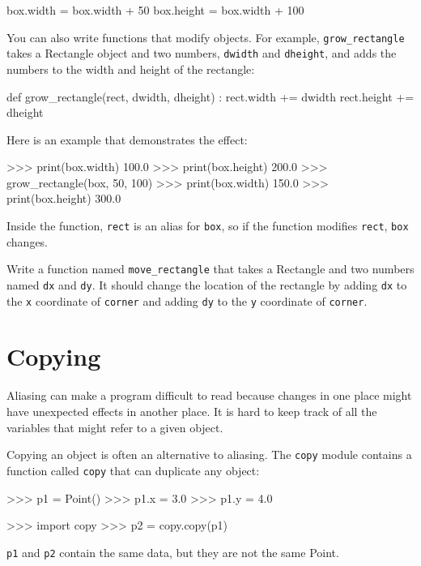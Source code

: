 \beforeverb
\begin{pycode}
box.width = box.width + 50
box.height = box.width + 100
\end{pycode}
\afterverb
%
You can also write functions that modify objects.  For example,
\verb"grow_rectangle" takes a Rectangle object and two numbers,
{\tt dwidth} and {\tt dheight}, and adds the numbers to the
width and height of the rectangle:

\beforeverb
\begin{pycode}
def grow_rectangle(rect, dwidth, dheight) :
    rect.width += dwidth
    rect.height += dheight
\end{pycode}
\afterverb
%
Here is an example that demonstrates the effect:

\beforeverb
\begin{pyinterpreter}
>>> print(box.width)
100.0
>>> print(box.height)
200.0
>>> grow_rectangle(box, 50, 100)
>>> print(box.width)
150.0
>>> print(box.height)
300.0
\end{pyinterpreter}
\afterverb
%
Inside the function, {\tt rect} is an
alias for {\tt box}, so if the function modifies {\tt rect}, 
{\tt box} changes.

\begin{exercise}
Write a function named \verb"move_rectangle" that takes
a Rectangle and two numbers named {\tt dx} and {\tt dy}.  It
should change the location of the rectangle by adding {\tt dx}
to the {\tt x} coordinate of {\tt corner} and adding {\tt dy}
to the {\tt y} coordinate of {\tt corner}.
\end{exercise}


\section{Copying}


Aliasing can make a program difficult to read because changes
in one place might have unexpected effects in another place.
It is hard to keep track of all the variables that might refer
to a given object.


Copying an object is often an alternative to aliasing.
The {\tt copy} module contains a function called {\tt copy} that
can duplicate any object:

\beforeverb
\begin{pyinterpreter}
>>> p1 = Point()
>>> p1.x = 3.0
>>> p1.y = 4.0

>>> import copy
>>> p2 = copy.copy(p1)
\end{pyinterpreter}
\afterverb
%
{\tt p1} and {\tt p2} contain the same data, but they are
not the same Point.

